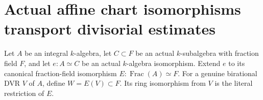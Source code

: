 \section{Actual affine chart isomorphisms transport divisorial estimates}

\begin{definition}
\label{def:c0n-chart-dvr-transport}
\leanok
Let $A$ be an integral $k$-algebra, let $C\subset F$ be an actual
$k$-subalgebra with fraction field $F$, and let $e:A\simeq C$ be an actual
$k$-algebra isomorphism.  Extend $e$ to its canonical fraction-field
isomorphism $E:\operatorname{Frac}(A)\simeq F$.
For a genuine birational DVR $V$ of $A$, define $W=E(V)\subset F$.
Its ring isomorphism from $V$ is the literal restriction of $E$.
\end{definition}

